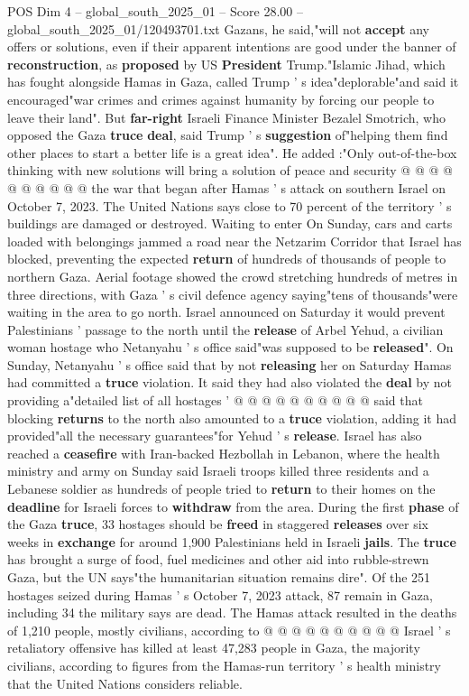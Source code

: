 \begin{textsample}{POS Dim 4 – global\_south\_2025\_01 – Score 28.00 – global\_south\_2025\_01/120493701.txt}
Gazans, he said,"will not \textbf{accept} any offers or solutions, even if their apparent intentions are good under the banner of \textbf{reconstruction}, as \textbf{proposed} by US \textbf{President} Trump."Islamic Jihad, which has fought alongside Hamas in Gaza, called Trump ' s idea"deplorable"and said it encouraged"war crimes and crimes against humanity by forcing our people to leave their land".
But \textbf{far-right} Israeli Finance Minister Bezalel Smotrich, who opposed the Gaza \textbf{truce} \textbf{deal}, said Trump ' s \textbf{suggestion} of"helping them find other places to start a better life is a great idea".
He added :"Only out-of-the-box thinking with new solutions will bring a solution of peace and security @ @ @ @ @ @ @ @ @ @ the war that began after Hamas ' s attack on southern Israel on October 7, 2023.
The United Nations says close to 70 percent of the territory ' s buildings are damaged or destroyed.
Waiting to enter On Sunday, cars and carts loaded with belongings jammed a road near the Netzarim Corridor that Israel has blocked, preventing the expected \textbf{return} of hundreds of thousands of people to northern Gaza.
Aerial footage showed the crowd stretching hundreds of metres in three directions, with Gaza ' s civil defence agency saying"tens of thousands"were waiting in the area to go north.
Israel announced on Saturday it would prevent Palestinians ' passage to the north until the \textbf{release} of Arbel Yehud, a civilian woman hostage who Netanyahu ' s office said"was supposed to be \textbf{released}".
On Sunday, Netanyahu ' s office said that by not \textbf{releasing} her on Saturday Hamas had committed a \textbf{truce} violation.
It said they had also violated the \textbf{deal} by not providing a"detailed list of all hostages ' @ @ @ @ @ @ @ @ @ @ said that blocking \textbf{returns} to the north also amounted to a \textbf{truce} violation, adding it had provided"all the necessary guarantees"for Yehud ' s \textbf{release}.
Israel has also reached a \textbf{ceasefire} with Iran-backed Hezbollah in Lebanon, where the health ministry and army on Sunday said Israeli troops killed three residents and a Lebanese soldier as hundreds of people tried to \textbf{return} to their homes on the \textbf{deadline} for Israeli forces to \textbf{withdraw} from the area.
During the first \textbf{phase} of the Gaza \textbf{truce}, 33 hostages should be \textbf{freed} in staggered \textbf{releases} over six weeks in \textbf{exchange} for around 1,900 Palestinians held in Israeli \textbf{jails}.
The \textbf{truce} has brought a surge of food, fuel medicines and other aid into rubble-strewn Gaza, but the UN says"the humanitarian situation remains dire".
Of the 251 hostages seized during Hamas ' s October 7, 2023 attack, 87 remain in Gaza, including 34 the military says are dead.
The Hamas attack resulted in the deaths of 1,210 people, mostly civilians, according to @ @ @ @ @ @ @ @ @ @ Israel ' s retaliatory offensive has killed at least 47,283 people in Gaza, the majority civilians, according to figures from the Hamas-run territory ' s health ministry that the United Nations considers reliable.


\end{textsample}
